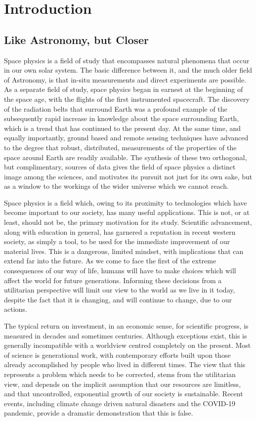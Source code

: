 \chapter{Introduction}

\section{Like Astronomy, but Closer}

Space physics is a field of study that encompasses natural phenomena that occur in our own solar system. The basic difference between it, and the much older field of Astronomy, is that in-situ measurements and direct experiments are possible. As a separate field of study, space physics began in earnest at the beginning of the space age, with the flights of the first instrumented spacecraft. The discovery of the radiation belts that surround Earth was a profound example of the subsequently rapid increase in knowledge about the space surrounding Earth, which is a trend that has continued to the present day. At the same time, and equally importantly, ground based and remote sensing techniques have advanced to the degree that robust, distributed, measurements of the properties of the space around Earth are readily available. The synthesis of these two orthogonal, but complimentary, sources of data gives the field of space physics a distinct image among the sciences, and motivates its pursuit not just for its own sake, but as a window to the workings of the wider universe which we cannot reach.

Space physics is a field which, owing to its proximity to technologies which have become important to our society, has many useful applications. This is not, or at least, should not be, the primary motivation for its study. Scientific advancement, along with education in general, has garnered a reputation in recent western society, as simply a tool, to be used for the immediate improvement of our material lives. This is a dangerous, limited mindset, with implications that can extend far into the future. As we come to face the first of the extreme consequences of our way of life, humans will have to make choices which will affect the world for future generations. Informing these decisions from a utilitarian perspective will limit our view to the world as we live in it today, despite the fact that it is changing, and will continue to change, due to our actions. 

The typical return on investment, in an economic sense, for scientific progress, is measured in decades and sometimes centuries. Although exceptions exist, this is generally incompatible with a worldview centred completely on the present. Most of science is generational work, with contemporary efforts built upon those already accomplished by people who lived in different times. The view that this represents a problem which needs to be corrected, stems from the utilitarian view, and depends on the implicit assumption that our resources are limitless, and that uncontrolled, exponential growth of our society is sustainable. Recent events, including climate change driven natural disasters and the COVID-19 pandemic, provide a dramatic demonstration that this is false. 

